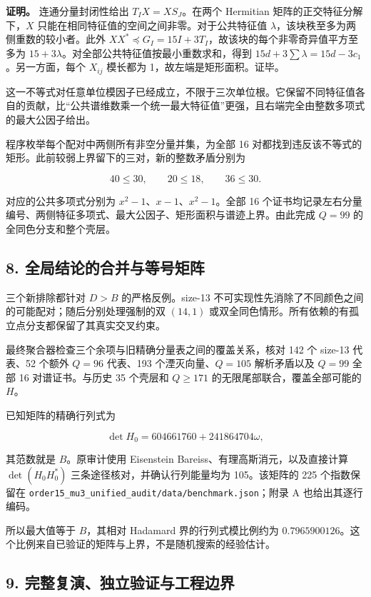 \documentclass[
  11pt,
  a4paper,
]{article}
\begin{document}
\textbf{证明。} 连通分量封闭性给出 \(T_I X=X S_J\)。在两个 Hermitian
矩阵的正交特征分解下，\(X\)
只能在相同特征值的空间之间非零。对于公共特征值
\(\lambda\)，该块秩至多为两侧重数的较小者。此外
\(XX^*\preceq G_I=15I+3T_I\)，故该块的每个非零奇异值平方至多为
\(15+3\lambda\)。对全部公共特征值按最小重数求和，得到
\(15d+3\sum\lambda=15d-3c_1\)。另一方面，每个 \(X_{ij}\) 模长都为
1，故左端是矩形面积。证毕。

这一不等式对任意单位模因子已经成立，不限于三次单位根。它保留不同特征值各自的贡献，比``公共谱维数乘一个统一最大特征值''更强，且右端完全由整数多项式的最大公因子给出。

程序枚举每个配对中两侧所有非空分量并集，为全部 16
对都找到违反该不等式的矩形。此前较弱上界留下的三对，新的整数矛盾分别为

\[40\le30,\qquad20\le18,\qquad36\le30.\]

对应的公共多项式分别为 \(x^2-1\)、\(x-1\)、\(x^2-1\)。全部 16
个证书均记录左右分量编号、两侧特征多项式、最大公因子、矩形面积与谱迹上界。由此完成
\(Q=99\) 的全同色分支和整个壳层。

\subsection{8.
全局结论的合并与等号矩阵}\label{ux5168ux5c40ux7ed3ux8bbaux7684ux5408ux5e76ux4e0eux7b49ux53f7ux77e9ux9635}

三个新排除都针对 \(D>B\) 的严格反例。size-13
不可实现性先消除了不同颜色之间的可能配对；随后分别处理强制的双
\((14,1)\)
或双全同色情形。所有依赖的有孤立点分支都保留了其真实交叉约束。

最终聚合器检查三个余项与旧精确分量表之间的覆盖关系，核对 142 个 size-13
代表、52 个额外 \(Q=96\) 代表、193 个湮灭向量、\(Q=105\) 解析矛盾以及
\(Q=99\) 全部 16 对谱证书。与历史 35 个壳层和 \(Q\ge171\)
的无限尾部联合，覆盖全部可能的 \(H\)。

已知矩阵的精确行列式为

\[\det H_0=604661760+241864704\omega,\]

其范数就是 \(B\)。原审计使用 Eisenstein
Bareiss、有理高斯消元，以及直接计算 \(\det(H_0H_0^*)\)
三条途径核对，并确认行列能量均为 105。该矩阵的 225 个指数保留在
\texttt{order15\_mu3\_unified\_audit/data/benchmark.json}；附录 A
也给出其逐行编码。

所以最大值等于 \(B\)，其相对 Hadamard 界的行列式模比例约为
\(0.7965900126\)。这个比例来自已验证的矩阵与上界，不是随机搜索的经验估计。

\subsection{9.
完整复演、独立验证与工程边界}\label{ux5b8cux6574ux590dux6f14ux72ecux7acbux9a8cux8bc1ux4e0eux5de5ux7a0bux8fb9ux754c}
\end{document}
